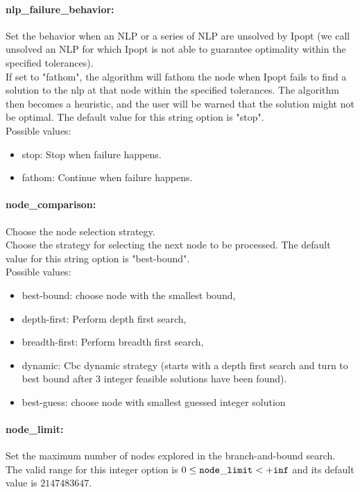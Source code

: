 \paragraph{nlp\_failure\_behavior:}\label{opt:nlp_failure_behavior} Set the behavior when an NLP or a series of NLP are unsolved by Ipopt (we call unsolved an NLP for which Ipopt is not able to guarantee optimality within the specified tolerances). \\
 If set to "fathom", the algorithm will fathom the node when Ipopt fails to find a solution to the nlp at that node within the specified tolerances. The algorithm then becomes a heuristic, and the user will be warned that the solution might not be optimal. The default value for this string option is "stop".
\\ 
Possible values:
\begin{itemize}
   \item stop: Stop when failure happens.
   \item fathom: Continue when failure happens.
\end{itemize}

\paragraph{node\_comparison:}\label{opt:node_comparison} Choose the node selection strategy. \\
 Choose the strategy for selecting the next node to be processed. The default value for this string option is "best-bound".
\\ 
Possible values:
\begin{itemize}
   \item best-bound: choose node with the smallest bound,
   \item depth-first: Perform depth first search,
   \item breadth-first: Perform breadth first search,
   \item dynamic: Cbc dynamic strategy (starts with a depth first search and turn to best bound after 3 integer feasible solutions have been found).
   \item best-guess: choose node with smallest guessed integer solution
\end{itemize}

\paragraph{node\_limit:}\label{opt:node_limit} Set the maximum number of nodes explored in the branch-and-bound search. \\
 The valid range for this integer option is
$0 \le {\tt node\_limit } <  {\tt +inf}$
and its default value is $2147483647$.


